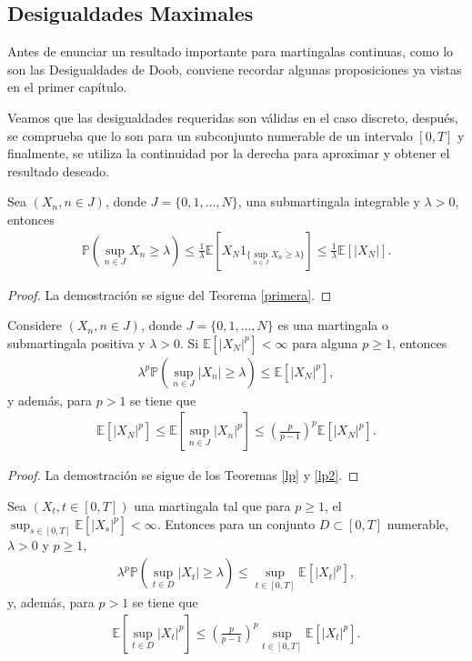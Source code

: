 \subsection{Desigualdades Maximales}
Antes de enunciar un resultado importante para martingalas continuas, como lo son las Desigualdades de Doob, conviene recordar algunas proposiciones ya vistas en el primer capítulo.

Veamos que las desigualdades requeridas son válidas en el caso discreto, después, se comprueba que lo son para un subconjunto numerable de un intervalo $[0, T]$ y finalmente, se utiliza la continuidad por la derecha para aproximar y obtener el resultado deseado.

\begin{proposition}
	Sea $(X_n, n \in J)$, donde $J = \{0, 1, \ldots, N\}$, una submartingala integrable y $\lambda > 0$, entonces
    \begin{align*}
		\mathbb{P} \left( \sup_{n \in J} X_n \geq \lambda \right) \leq \frac{1}{\lambda} \mathbb{E}\left[ X_N 1_{\{ \sup_{n \in J} X_n \geq \lambda\}} \right] \leq \frac{1}{\lambda} \mathbb{E}\left[ |X_N| \right].
	\end{align*}
\end{proposition}
\begin{proof}
	La demostración se sigue del Teorema \ref{primera}.
\end{proof}

\begin{proposition}
	Considere $(X_n, n \in J)$, donde $J = \{0, 1, \ldots, N\}$ es una martingala o submartingala positiva y $\lambda > 0$. Si $\mathbb{E}[|X_N|^p] < \infty$ para alguna $p \geq 1$, entonces
    \begin{align*}
		\lambda^p \mathbb{P} \left( \sup_{n \in J} |X_n| \geq \lambda \right) \leq \mathbb{E}[|X_N|^p],
	\end{align*}
y además, para $p > 1$ se tiene que
	\begin{align*}
		\mathbb{E} [|X_N|^p] \leq \mathbb{E} \left[ \sup_{n \in J} |X_n|^p \right] \leq \left( \frac{p}{p-1} \right)^p \mathbb{E}[|X_N|^p].
	\end{align*}
\end{proposition}
\begin{proof}
	La demostración se sigue de los Teoremas \ref{lp} y \ref{lp2}.
\end{proof}

\begin{proposition}
\label{lp3}
	Sea $(X_t, t \in [0, T])$ una martingala tal que para $p \geq 1$, el $\sup_{s \in [0, T]} \mathbb{E}[|X_s|^p] < \infty$. Entonces para un conjunto $D \subset [0, T]$ numerable, $\lambda > 0$ y $p \geq 1$,
    \begin{align*}
    \lambda^p \mathbb{P} \left( \sup_{t \in D} |X_t| \geq \lambda \right)  \leq \sup_{t \in [0, T]} \mathbb{E}[|X_t|^p], 
    \end{align*}
y, además, para $p > 1$ se tiene que
	\begin{align*}
	\mathbb{E} \left[ \sup_{t \in D} |X_t|^p \right] \leq \left( \frac{p}{p-1} \right)^p \sup_{t \in [0, T]} \mathbb{E}[|X_t|^p].
	\end{align*}
\end{proposition}

